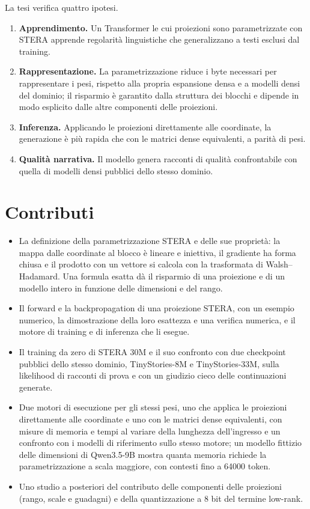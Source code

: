 La tesi verifica quattro ipotesi.
\begin{enumerate}
\item[\textbf{H1}] \textbf{Apprendimento.} Un Transformer le cui proiezioni sono parametrizzate con STERA apprende regolarità linguistiche che generalizzano a testi esclusi dal training.
\item[\textbf{H2}] \textbf{Rappresentazione.} La parametrizzazione riduce i byte necessari per rappresentare i pesi, rispetto alla propria espansione densa e a modelli densi del dominio; il risparmio è garantito dalla struttura dei blocchi e dipende in modo esplicito dalle altre componenti delle proiezioni.
\item[\textbf{H3}] \textbf{Inferenza.} Applicando le proiezioni direttamente alle coordinate, la generazione è più rapida che con le matrici dense equivalenti, a parità di pesi.
\item[\textbf{H4}] \textbf{Qualità narrativa.} Il modello genera racconti di qualità confrontabile con quella di modelli densi pubblici dello stesso dominio.
\end{enumerate}

\section*{Contributi}

\begin{itemize}
\item La definizione della parametrizzazione STERA e delle sue proprietà: la mappa dalle coordinate al blocco è lineare e iniettiva, il gradiente ha forma chiusa e il prodotto con un vettore si calcola con la trasformata di Walsh--Hadamard. Una formula esatta dà il risparmio di una proiezione e di un modello intero in funzione delle dimensioni e del rango.
\item Il forward e la backpropagation di una proiezione STERA, con un esempio numerico, la dimostrazione della loro esattezza e una verifica numerica, e il motore di training e di inferenza che li esegue.
\item Il training da zero di STERA 30M e il suo confronto con due checkpoint pubblici dello stesso dominio, TinyStories-8M e TinyStories-33M, sulla likelihood di racconti di prova e con un giudizio cieco delle continuazioni generate.
\item Due motori di esecuzione per gli stessi pesi, uno che applica le proiezioni direttamente alle coordinate e uno con le matrici dense equivalenti, con misure di memoria e tempi al variare della lunghezza dell'ingresso e un confronto con i modelli di riferimento sullo stesso motore; un modello fittizio delle dimensioni di Qwen3.5-9B mostra quanta memoria richiede la parametrizzazione a scala maggiore, con contesti fino a \num{64000} token.
\item Uno studio a posteriori del contributo delle componenti delle proiezioni (rango, scale e guadagni) e della quantizzazione a 8 bit del termine low-rank.
\end{itemize}


